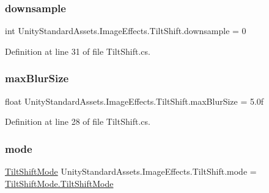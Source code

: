 \subsubsection{\texorpdfstring{downsample}{downsample}}
{\footnotesize\ttfamily int Unity\+Standard\+Assets.\+Image\+Effects.\+Tilt\+Shift.\+downsample = 0}



Definition at line 31 of file Tilt\+Shift.\+cs.

\mbox{\label{class_unity_standard_assets_1_1_image_effects_1_1_tilt_shift_a4f5be3f7fffdb90e6b0be07a7ab30308}} 
\subsubsection{\texorpdfstring{max\+Blur\+Size}{maxBlurSize}}
{\footnotesize\ttfamily float Unity\+Standard\+Assets.\+Image\+Effects.\+Tilt\+Shift.\+max\+Blur\+Size = 5.\+0f}



Definition at line 28 of file Tilt\+Shift.\+cs.

\mbox{\label{class_unity_standard_assets_1_1_image_effects_1_1_tilt_shift_a7448aeb0fe5c22eab4b9bb25f338ac18}} 
\subsubsection{\texorpdfstring{mode}{mode}}
{\footnotesize\ttfamily \mbox{\hyperlink{class_unity_standard_assets_1_1_image_effects_1_1_tilt_shift_a30526c23a7fabb0f3b6e86e669fbeaae}{Tilt\+Shift\+Mode}} Unity\+Standard\+Assets.\+Image\+Effects.\+Tilt\+Shift.\+mode = \mbox{\hyperlink{class_unity_standard_assets_1_1_image_effects_1_1_tilt_shift_a30526c23a7fabb0f3b6e86e669fbeaaea6d0e5d7c0b9dd0bd373b188a1dee4a4e}{Tilt\+Shift\+Mode.\+Tilt\+Shift\+Mode}}}



